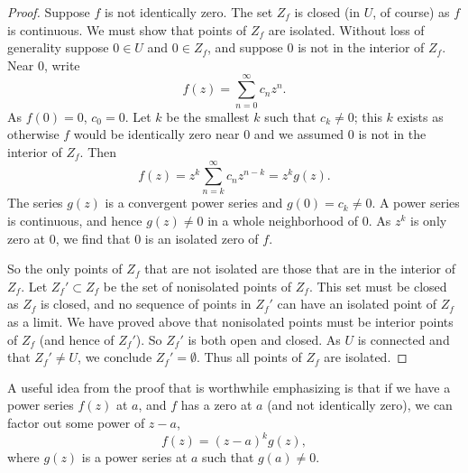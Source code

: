 \documentclass[12pt,openany]{book}
\theoremstyle{plain}
\theoremstyle{remark}
\theoremstyle{definition}
\theoremstyle{exercise}
\theoremstyle{example}
\begin{document}
\begin{proof}
Suppose $f$ is not identically zero.
The set $Z_f$ is closed (in $U$, of course) as $f$ is continuous.  We must show
that points of $Z_f$ are isolated.
Without loss of generality suppose $0 \in U$ and $0 \in Z_f$,
and suppose $0$ is not in the interior of $Z_f$.
Near $0$, write
\begin{equation*}
f(z) = \sum_{n=0}^\infty c_n z^n .
\end{equation*}
As $f(0) = 0$, $c_0 =0$.  Let $k$ be the smallest $k$ such that $c_k \not=0$;
this $k$ exists as otherwise $f$ would be identically zero near $0$
and we assumed $0$ is not in the interior of $Z_f$.  Then
\begin{equation*}
f(z) = z^k \sum_{n=k}^\infty c_n z^{n-k} = z^k g(z) .
\end{equation*}
The series $g(z)$ is a convergent power series and $g(0) = c_k \not=
0$.  A power series is continuous, and hence $g(z) \not= 0$ in a whole
neighborhood of $0$.
As $z^k$ is only zero at $0$, we find that $0$ is an isolated zero of $f$.

So the only points of $Z_f$ that are not isolated are those that are in the
interior of $Z_f$.  Let $Z_f' \subset Z_f$ be the set of nonisolated points
of $Z_f$.  This set must be closed as $Z_f$ is closed, and no sequence
of points in $Z_f'$ can
have an isolated point of $Z_f$ as a limit.
We have proved above that nonisolated
points must be interior points of $Z_f$ (and hence of $Z_f'$).
So $Z_f'$ is both open and closed.  As $U$ is connected and 
that $Z_f' \not= U$, we conclude $Z_f' = \emptyset$.
Thus all points of $Z_f$ are isolated.
\end{proof}

A useful idea from the proof that is worthwhile emphasizing
is that if we have a power series $f(z)$ at $a$,
and $f$ has a zero at $a$ (and not identically zero),
we can factor out some power of $z-a$,
\begin{equation*}
f(z) = {(z-a)}^k g(z) ,
\end{equation*}
where $g(z)$ is a power series at $a$ such that $g(a) \not= 0$.
\end{document}
